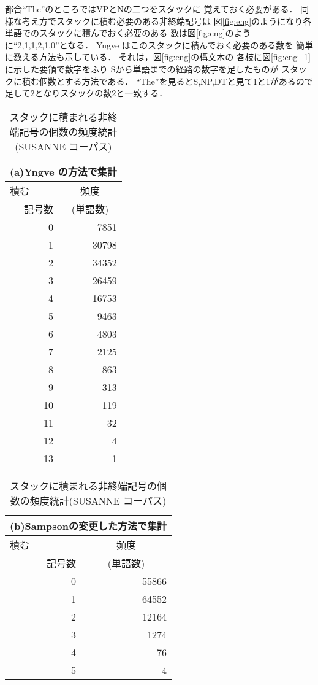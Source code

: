 都合``The''のところではVPとNの二つをスタックに
覚えておく必要がある．
同様な考え方でスタックに積む必要のある非終端記号は
図\ref{fig:eng}のようになり各単語でのスタックに積んでおく必要のある
数は図\ref{fig:eng}のように``2,1,1,2,1,0''となる．
Yngve はこのスタックに積んでおく必要のある数を
簡単に数える方法も示している．
それは，図\ref{fig:eng}の構文木の
各枝に図\ref{fig:eng_1}に示した要領で数字をふり
Sから単語までの経路の数字を足したものが
スタックに積む個数とする方法である．
``The''を見るとS,NP,DTと見て1と1があるので
足して2となりスタックの数2と一致する．

\begin{table}[t]
\vspace{-1mm}
  \caption{スタックに積まれる非終端記号の個数の頻度統計(SUSANNE コーパス)}
  \label{tab:hindo_toukei_eng_sussane}
  \begin{center}
\small\small\renewcommand{\arraystretch}{}
\begin{tabular}[t]{|r|r|}
\multicolumn{2}{c}{(a)Yngve の方法で集計}\\\hline
\multicolumn{1}{|l|}{積む} & \multicolumn{1}{c|}{頻度}\\
記号数    &   \multicolumn{1}{c|}{(単語数)} \\\hline
0 & 7851 \\
1 & 30798 \\
2 & 34352 \\
3 & 26459 \\
4 & 16753 \\
5 & 9463 \\
6 & 4803 \\
7 & 2125\\
8 & 863\\
9 & 313\\
10 & 119\\
11 & 32\\
12 & 4\\
13 & 1\\\hline
\end{tabular}
\vspace{-5mm}
\begin{tabular}[t]{|r|r|}
\multicolumn{2}{c}{(b)Sampsonの変更した方法で集計}\\\hline
\multicolumn{1}{|l|}{積む}& \multicolumn{1}{c|}{頻度}\\
記号数     &   \multicolumn{1}{c|}{(単語数)} \\\hline
0 & 55866\\
1 & 64552\\
2 & 12164\\
3 & 1274\\
4 & 76\\
5 & 4\\\hline
\end{tabular}
\end{center}
\vspace{3mm}
\end{table}

